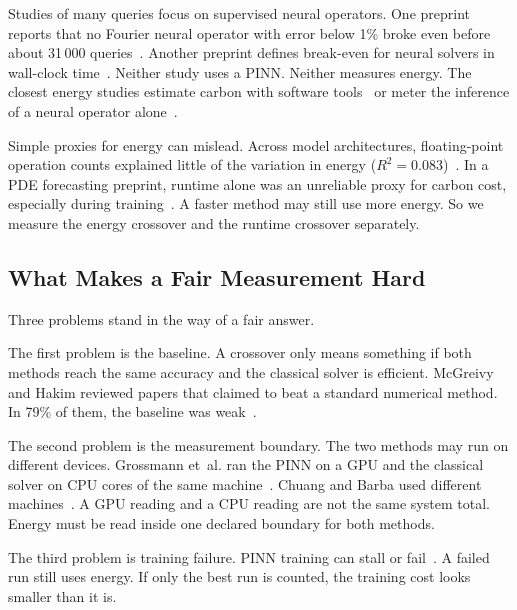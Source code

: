 \documentclass[journal]{IEEEtran}
\begin{document}
Studies of many queries focus on supervised neural operators. One preprint reports that no Fourier neural operator with error below 1\% broke even before about 31\,000 queries~\cite{huang2026review}. Another preprint defines break-even for neural solvers in wall-clock time~\cite{zhang2026}. Neither study uses a PINN. Neither measures energy. The closest energy studies estimate carbon with software tools~\cite{kapoor2025} or meter the inference of a neural operator alone~\cite{yoo2026}.

Simple proxies for energy can mislead. Across model architectures, floating-point operation counts explained little of the variation in energy ($R^2=0.083$)~\cite{henderson2020}. In a PDE forecasting preprint, runtime alone was an unreliable proxy for carbon cost, especially during training~\cite{wilson2025}. A faster method may still use more energy. So we measure the energy crossover and the runtime crossover separately.

\subsection{What Makes a Fair Measurement Hard}
Three problems stand in the way of a fair answer.

The first problem is the baseline. A crossover only means something if both methods reach the same accuracy and the classical solver is efficient. McGreivy and Hakim reviewed papers that claimed to beat a standard numerical method. In 79\% of them, the baseline was weak~\cite{mcgreivy2024}.

The second problem is the measurement boundary. The two methods may run on different devices. Grossmann et~al. ran the PINN on a GPU and the classical solver on CPU cores of the same machine~\cite{grossmann2024}. Chuang and Barba used different machines~\cite{chuang2022}. A GPU reading and a CPU reading are not the same system total. Energy must be read inside one declared boundary for both methods.

The third problem is training failure. PINN training can stall or fail~\cite{krishnapriyan2021,wang2022ntk,rathore2024}. A failed run still uses energy. If only the best run is counted, the training cost looks smaller than it is.
\end{document}
